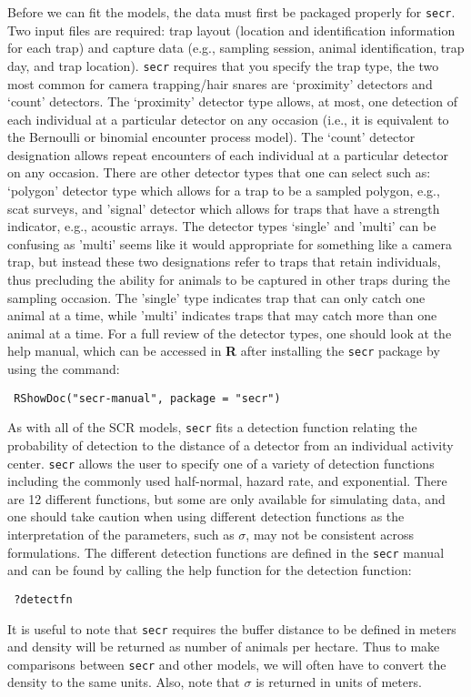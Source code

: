 {Before we can fit the models, the data must first be packaged properly
for 
\mbox{\tt secr}.  Two input files are required: trap layout (location and
identification information for each trap) and capture data (e.g.,
sampling session, animal identification, trap day, and trap location).
\mbox{\tt secr} requires that you specify the trap type, the two most common for
camera trapping/hair snares are `proximity' detectors and `count'
detectors.  The `proximity' detector type allows, at most, one
detection of each individual at a particular detector on any occasion
(i.e., it is equivalent to the Bernoulli or binomial encounter process
model).
The `count' detector designation allows repeat encounters of each
individual at a particular detector on any occasion.  There are other
detector types that one can select such as: `polygon' detector type
which allows for a trap to be a sampled polygon, e.g., scat surveys,
and 'signal' detector which allows for traps that have a strength
indicator, e.g., acoustic arrays.  The detector types `single' and
'multi' can be confusing as 'multi' seems like it would appropriate
for something like a camera trap, but instead these two designations
refer to traps that retain individuals, thus precluding the ability
for animals to be captured in other traps during the sampling
occasion.  The 'single' type indicates trap that can only catch one
animal at a time, while 'multi' indicates traps that may catch more
than one animal at a time.  For a full review of the detector types,
one should look at the help manual, which can be accessed in {\bf R} after
installing the \mbox{\tt secr} package by using the command:
\begin{verbatim}
 RShowDoc("secr-manual", package = "secr")
\end{verbatim}
As with all of the SCR models, \mbox{\tt secr} fits a detection function relating
the probability of detection to the distance of a detector from an
individual activity center. \mbox{\tt secr} allows the user to specify one of a
variety of detection functions including the commonly used
half-normal, hazard rate, and exponential.  There are 12 different
functions, but some are only available for simulating data, and one
should take caution when using different detection functions as the
interpretation of the parameters, such as $\sigma$, may not be consistent
across formulations.  The different detection functions are defined in
the \mbox{\tt secr} manual and can be found by calling the help function for the
detection function:
\begin{verbatim}
 ?detectfn
\end{verbatim}
It is useful to note that \mbox{\tt secr} requires the buffer distance to be
defined in meters and density will be returned as number of animals
per hectare.  Thus to make comparisons between \mbox{\tt secr} and other models,
we will often have to convert the density to the same units.  Also,
note that $\sigma$ is returned in units of meters.


}
